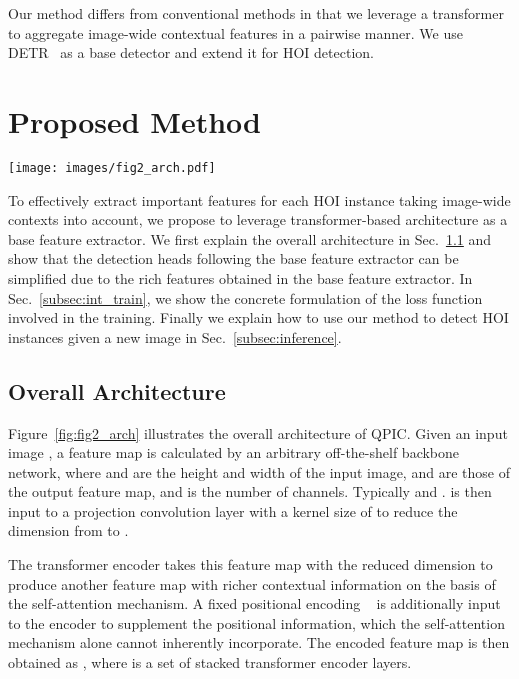 \documentclass[final]{cvpr}
\begin{document}
Our method differs from conventional methods in that we leverage a transformer to aggregate image-wide contextual features in a pairwise manner. We use DETR~\cite{carion_eccv2020} as a base detector and extend it for HOI detection. 

\section{Proposed Method}
\begin{figure*}[t]
\centering
\texttt{[image: images/fig2\_arch.pdf]}
\caption{Overall architecture of the proposed QPIC.}\label{fig:fig2_arch}
\vspace{-2.0ex}
\end{figure*}

To effectively extract important features for each HOI instance taking image-wide contexts into account, we propose to leverage transformer-based architecture as a base feature extractor.
We first explain the overall architecture in Sec.~\ref{subsec:architecture} and show that the detection heads following the base feature extractor can be simplified due to the rich features obtained in the base feature extractor.
In Sec.~\ref{subsec:int_train}, we show the concrete formulation of the loss function involved in the training.
Finally we explain how to use our method to detect HOI instances given a new image in Sec.~\ref{subsec:inference}.

\subsection{Overall Architecture}\label{subsec:architecture}

Figure~\ref{fig:fig2_arch} illustrates the overall architecture of QPIC.
Given an input image , a feature map  is calculated by an arbitrary off-the-shelf backbone network, where  and  are the height and width of the input image,  and  are those of the output feature map, and  is the number of channels. 
Typically  and .
 is then input to a projection convolution layer with a kernel size of  to reduce the dimension from  to .

The transformer encoder takes this feature map with the reduced dimension  to produce another feature map with richer contextual information on the basis of the self-attention mechanism.
A fixed positional encoding ~\cite{bello_iccv2019, parmar_icml2018, carion_eccv2020} is additionally input to the encoder to supplement the positional information, which the self-attention mechanism alone cannot inherently incorporate.
The encoded feature map  is then obtained as
, where  is a set of stacked transformer encoder layers.
\end{document}
